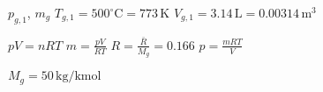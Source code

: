 \( p_{g,1} \), \( m_g \)  
\( T_{g,1} = 500^\circ \text{C} = 773 \, \text{K} \)  
\( V_{g,1} = 3.14 \, \text{L} = 0.00314 \, \text{m}^3 \)  

\( pV = nRT \)  
\( m = \frac{pV}{RT} \)  
\( R = \frac{\bar{R}}{M_g} = 0.166 \)  
\( p = \frac{mRT}{V} \)  

\( M_g = 50 \, \text{kg/kmol} \)